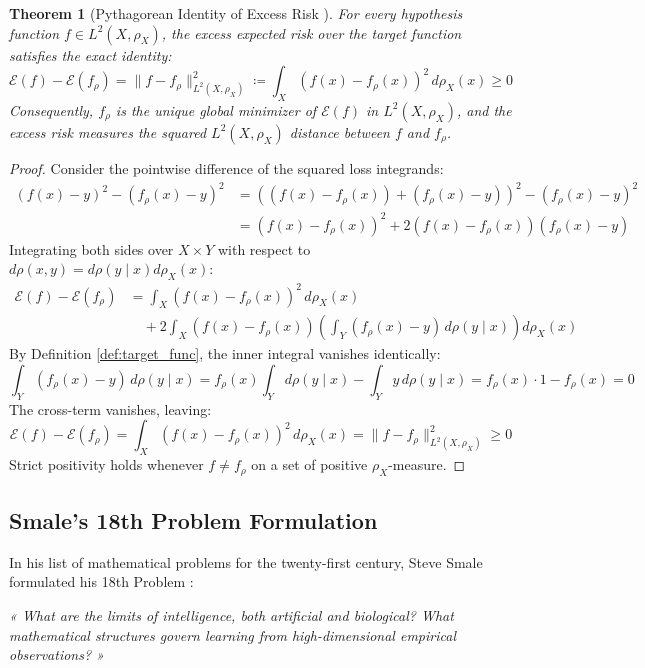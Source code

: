 \documentclass[11pt,a4paper]{article}
\newtheorem{theorem}{Theorem}[section]
\theoremstyle{definition}
\begin{document}
\begin{theorem}[Pythagorean Identity of Excess Risk \cite{cucker2002}]\label{thm:pythagorean_risk}
For every hypothesis function $f \in L^2(X, \rho_X)$, the excess expected risk over the target function satisfies the exact identity:
\begin{equation}\label{eq:excess_risk_identity}
\mathcal{E}(f) - \mathcal{E}(f_\rho) = \|f - f_\rho\|_{L^2(X, \rho_X)}^2 \coloneqq \int_X (f(x) - f_\rho(x))^2 \, d\rho_X(x) \ge 0
\end{equation}
Consequently, $f_\rho$ is the unique global minimizer of $\mathcal{E}(f)$ in $L^2(X, \rho_X)$, and the excess risk measures the squared $L^2(X, \rho_X)$ distance between $f$ and $f_\rho$.
\end{theorem}

\begin{proof}
Consider the pointwise difference of the squared loss integrands:
\begin{align*}
(f(x) - y)^2 - (f_\rho(x) - y)^2 &= \left( (f(x) - f_\rho(x)) + (f_\rho(x) - y) \right)^2 - (f_\rho(x) - y)^2 \\
&= (f(x) - f_\rho(x))^2 + 2 (f(x) - f_\rho(x)) (f_\rho(x) - y)
\end{align*}
Integrating both sides over $X \times Y$ with respect to $d\rho(x, y) = d\rho(y \mid x) d\rho_X(x)$:
\begin{align*}
\mathcal{E}(f) - \mathcal{E}(f_\rho) &= \int_X (f(x) - f_\rho(x))^2 \, d\rho_X(x) \\
&\quad + 2 \int_X (f(x) - f_\rho(x)) \left( \int_Y (f_\rho(x) - y) \, d\rho(y \mid x) \right) d\rho_X(x)
\end{align*}
By Definition \ref{def:target_func}, the inner integral vanishes identically:
\[
\int_Y (f_\rho(x) - y) \, d\rho(y \mid x) = f_\rho(x) \int_Y d\rho(y \mid x) - \int_Y y \, d\rho(y \mid x) = f_\rho(x) \cdot 1 - f_\rho(x) = 0
\]
The cross-term vanishes, leaving:
\[
\mathcal{E}(f) - \mathcal{E}(f_\rho) = \int_X (f(x) - f_\rho(x))^2 \, d\rho_X(x) = \|f - f_\rho\|_{L^2(X, \rho_X)}^2 \ge 0
\]
Strict positivity holds whenever $f \ne f_\rho$ on a set of positive $\rho_X$-measure.
\end{proof}

\subsection{Smale's 18th Problem Formulation}

In his list of mathematical problems for the twenty-first century, Steve Smale formulated his 18th Problem \cite{smale2000}:
\begin{center}
\textit{« What are the limits of intelligence, both artificial and biological? What mathematical structures govern learning from high-dimensional empirical observations? »}
\end{center}
\end{document}
